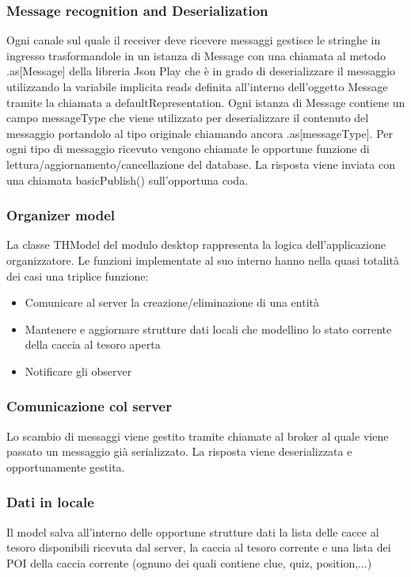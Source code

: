 \documentclass[12pt, italian]{article}
\begin{document}
\subsubsection*{Message recognition and Deserialization}
Ogni canale sul quale il receiver deve ricevere messaggi gestisce le stringhe in ingresso trasformandole in un istanza di Message con una chiamata al metodo .as[Message] della libreria Json Play che è in grado di deserializzare il messaggio utilizzando la variabile implicita reads definita all'interno dell'oggetto Message tramite la chiamata a defaultRepresentation. Ogni istanza di Message contiene un campo messageType che viene utilizzato per deserializzare il contenuto del messaggio portandolo al tipo originale chiamando ancora .as[messageType].
Per ogni tipo di messaggio ricevuto vengono chiamate le opportune funzione di lettura/aggiornamento/cancellazione del database.
La risposta viene inviata con una chiamata basicPublish() sull'opportuna coda.

\subsubsection{Organizer model}
La classe THModel del modulo desktop rappresenta la logica dell'applicazione organizzatore.
Le funzioni implementate al suo interno hanno nella quasi totalità dei casi una triplice funzione:
\begin{itemize}
	\item Comunicare al server la creazione/eliminazione di una entità
	\item Mantenere e aggiornare strutture dati locali che modellino lo stato corrente della caccia al tesoro aperta
	\item Notificare gli observer
\end{itemize}
\subsubsection*{Comunicazione col server}
Lo scambio di messaggi viene gestito tramite chiamate al broker al quale viene passato un messaggio già serializzato. La risposta viene deserializzata e opportunamente gestita.
\subsubsection*{Dati in locale}
Il model salva all'interno delle opportune strutture dati la lista delle cacce al tesoro disponibili ricevuta dal server, la caccia al tesoro corrente e una lista dei POI della caccia corrente (ognuno dei quali contiene clue, quiz, position,...)
\end{document}
